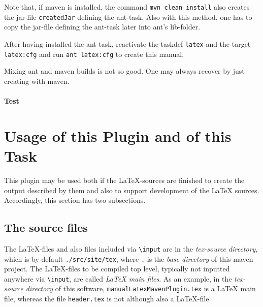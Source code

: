 \documentclass[12pt]{book}
\begin{document}
Note that, if maven is installed, the command {\tt mvn clean install} 
also creates the jar-file {\tt createdJar} defining the ant-task. 
Also with this method, one has to copy the jar-file defining the ant-task 
later into ant's lib-folder. 

After having installed the ant-task, 
reactivate the taskdef {\tt latex} and the target {\tt latex:cfg} 
and run {\tt ant latex:cfg} to create this manual. 

Mixing ant and maven builds is not so good. 
One may always recover by just creating with maven. 

\subsubsection{Test}

\chapter{Usage of this Plugin and of this Task}\label{chap:usage}

This plugin may be used both if the \LaTeX-sources are finished 
to create the output described by them 
and also to support development of the \LaTeX{} sources. 
Accordingly, this section has two subsections. 

\section{The source files}\label{sec:sources}

The \LaTeX-files and also files included via {\tt\textbackslash input} 
are in the {\em tex-source directory}, 
which is by default {\tt./src/site/tex}, 
where {\tt.} is the {\em base directory\/} of this maven-project. 
The \LaTeX-files to be compiled top level, 
typically not inputted anywhere via {\tt\textbackslash input}, 
are called {\em \LaTeX{} main files}. 
As an example, 
in the {\em tex-source directory\/} of this software, 
{\tt manualLatexMavenPlugin.tex} is a \LaTeX{} main file, 
whereas the file {\tt header.tex} is not although also a \LaTeX-file. 
\end{document}
